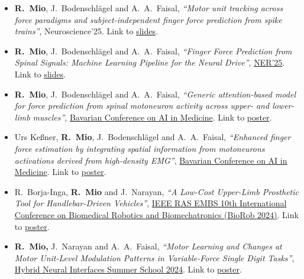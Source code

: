 \documentclass[a4paper,10pt]{article}
\begin{document}
\begin{itemize}
  \item \textbf{R.\ Mio}, J.\ Bodenschl\"agel and A.\ A.\ Faisal,
        \textit{``Motor unit tracking across force paradigms and subject-independent finger force
        prediction from spike trains''},
        Neuroscience'25.
        Link to \href{https://drive.google.com/file/d/13unzQtqwPZ9eM1asmOXzJiohuUaCmKiP/view}{slides}.

  \item \textbf{R.\ Mio}, J.\ Bodenschl\"agel and A.\ A.\ Faisal,
        \textit{``Finger Force Prediction from Spinal Signals: Machine Learning Pipeline for the
        Neural Drive''},
        \href{https://ieeexplore.ieee.org/document/11589004}{NER'25}.
        Link to \href{https://drive.google.com/file/d/1tA1x0ZtYpeS_oH596BxBRVkEx5lqLxT4/view}{slides}.

  \item \textbf{R.\ Mio}, J.\ Bodenschl\"agel and A.\ A.\ Faisal,
        \textit{``Generic attention-based model for force prediction from spinal motoneuron
        activity across upper- and lower-limb muscles''},
        \href{https://events.hifis.net/event/2048/overview}{Bavarian Conference on AI in Medicine}.
        Link to \href{https://drive.google.com/file/d/1Bf5zGzO_efQ2zlAygwavf4fBbF0I2lSK/view}{poster}.

  \item Urs Ke\ss ner, \textbf{R.\ Mio}, J.\ Bodenschl\"agel and A.\ A.\ Faisal,
        \textit{``Enhanced finger force estimation by integrating spatial information from
        motoneurons activations derived from high-density EMG''},
        \href{https://events.hifis.net/event/2048/overview}{Bavarian Conference on AI in Medicine}.
        Link to \href{https://drive.google.com/file/d/1DoIFTXmPk0SWMkDUIpufXHAe1I7s-B4X/view}{poster}.

  \item R.\ Borja-Inga, \textbf{R.\ Mio} and J.\ Narayan,
        \textit{``A Low-Cost Upper-Limb Prosthetic Tool for Handlebar-Driven Vehicles''},
        \href{https://www.biorob2024.org/}{IEEE RAS EMBS 10th International Conference on
        Biomedical Robotics and Biomechatronics (BioRob 2024)}.
        Link to \href{https://drive.google.com/file/d/1gZYVSDfa1JtAwqObbTi2WXZDAx2tNI-v/view}{poster}.

  \item \textbf{R.\ Mio,} J.\ Narayan and A.\ A.\ Faisal,
        \textit{``Motor Learning and Changes at Motor Unit-Level Modulation Patterns in
        Variable-Force Single Digit Tasks''},
        \href{https://www.hybridneuro.feri.um.si/summerschools/summer_school_mb.html}{Hybrid Neural
        Interfaces Summer School 2024}.
        Link to \href{https://drive.google.com/file/d/1yv2fcYvdUpcuaJlFeGLkEX01z2izDLAD/view}{poster}.


\end{itemize}
\end{document}
